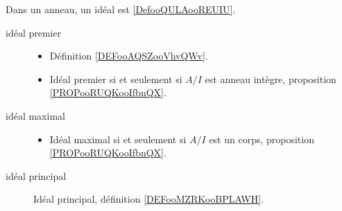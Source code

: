 Dans un anneau, un idéal est \ref{DefooQULAooREUIU}.
\begin{description}
	\item[idéal premier]\hspace{1cm}
	\begin{itemize}
		\item
		      Définition \ref{DEFooAQSZooVhvQWv}.
		\item Idéal premier si et seulement si \( A/I\) est anneau intègre, proposition \ref{PROPooRUQKooIfbnQX}.
	\end{itemize}
	\item[idéal maximal]\hspace{1cm}
	\begin{itemize}
		\item
		      Idéal maximal si et seulement si \( A/I\) est un corps, proposition \ref{PROPooRUQKooIfbnQX}.
	\end{itemize}
	\item[idéal principal]
		Idéal principal, définition \ref{DEFooMZRKooBPLAWH}.
\end{description}
